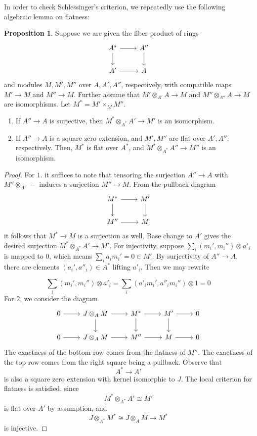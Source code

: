 \documentclass{article}
\theoremstyle{definition}
\theoremstyle{definition}
\theoremstyle{definition}
\theoremstyle{definition}
\newtheorem{proposition}{Proposition}[theorem]
\theoremstyle{definition}
\theoremstyle{definition}
\theoremstyle{definition}
\begin{document}
In order to check Schlessinger's criterion, we repeatedly use the following algebraic lemma on flatness:
\begin{proposition}
	Suppose we are given the fiber product of rings
	\[\begin{tikzcd}
	{A^*} & {A''} \\
	{A'} & A
	\arrow[from=1-1, to=1-2]
	\arrow[from=1-1, to=2-1]
	\arrow[from=1-2, to=2-2]
	\arrow[from=2-1, to=2-2]
\end{tikzcd}\]
and modules $M,M',M''$ over $A,A',A''$, respectively, with compatible maps 
$M'\to M$ and $M''\to M$. Further assume that $M'\otimes_{A'} A\to M $ and $M''\otimes_{A''} A\to M$ are isomorphisms. Let $M^*= M'\times_{M}M''$. 
\begin{enumerate}
	\item If $A''\to A$ is surjective, then $M^*\otimes_{A^*} A'\to M'$ is an isomorphism.
	\item If $A''\to A$ is a square zero extension, and $M',M''$ are flat over $A',A''$, respectively. Then, $M^*$ is flat over $A^*$, and $M^*\otimes_{A^*}A''\to M''$ is an isomorphism.
\end{enumerate}

\end{proposition}
\begin{proof}
	For $1.$ it suffices to note that tensoring the surjection $A''\to A$ with $M''\otimes_{A''} - $ induces a surjection $M''\to M$. From the pullback diagram 
	\[\begin{tikzcd}
	{M^*} & {M'} \\
	{M''} & M
	\arrow[from=1-1, to=1-2]
	\arrow[from=1-1, to=2-1]
	\arrow[from=1-2, to=2-2]
	\arrow[from=2-1, to=2-2]
\end{tikzcd}\]
it follows that $M^*\to M$ is a surjection as well. Base change to $A'$ gives the desired surjection $M^*\otimes_{A^*} A'\to M'$. For injectivity, 
suppose $\sum_i (m_i',m_i'')\otimes a'_i$ is mapped to $0$, which means $\sum_i a_im_i'=0\in M'$. By surjectivity of $A''\to A$, there are elements $(a_i',a''_i)\in A^*$ lifting $a'_i$. Then we may rewrite 

\[\sum_i (m_i',m_i'') \otimes a'_i= \sum_i (a'_im_i',a''_im_i'')\otimes 1 = 0\]For $2$, we consider the diagram
\[\begin{tikzcd}
	0 & {J\otimes_AM} & {M^*} & {M'} & 0 \\
	0 & {J\otimes_A M} & {M''} & M & 0
	\arrow[from=1-1, to=1-2]
	\arrow[from=1-2, to=1-3]
	\arrow[from=1-2, to=2-2]
	\arrow[from=1-3, to=1-4]
	\arrow[from=1-3, to=2-3]
	\arrow[from=1-4, to=1-5]
	\arrow[from=1-4, to=2-4]
	\arrow[from=2-1, to=2-2]
	\arrow[from=2-2, to=2-3]
	\arrow[from=2-3, to=2-4]
	\arrow[from=2-4, to=2-5]
\end{tikzcd}\]The exactness of the bottom row comes from the flatness of $M''$. The exactness of the top row comes from the right square being a pullback. Observe that 
\[A^*\to A'\]
is also a square zero extension with kernel isomorphic to $J$. The local criterion for flatness is satisfied, since 
\[M^*\otimes_{A^*}A'\cong M'\] 
is flat over $A'$ by assumption, and 
\[J\otimes_{A^*} M^*\cong J\otimes_A M\to M^* \] is injective.
\end{proof}
\end{document}
